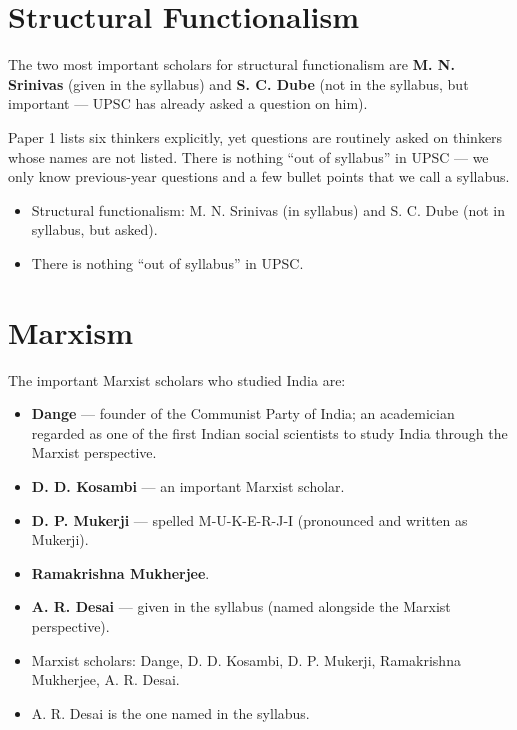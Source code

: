 \section{Structural Functionalism}

The two most important scholars for structural functionalism are \textbf{M. N. Srinivas} (given in the syllabus) and \textbf{S. C. Dube} (not in the syllabus, but important --- UPSC has already asked a question on him).

\begin{CriticalPoint}
Paper 1 lists six thinkers explicitly, yet questions are routinely asked on thinkers whose names are not listed. There is nothing ``out of syllabus'' in UPSC --- we only know previous-year questions and a few bullet points that we call a syllabus.
\end{CriticalPoint}

\begin{QuickRevision}
\begin{itemize}
\item Structural functionalism: M. N. Srinivas (in syllabus) and S. C. Dube (not in syllabus, but asked).
\item There is nothing ``out of syllabus'' in UPSC.
\end{itemize}
\end{QuickRevision}

\section{Marxism}

The important Marxist scholars who studied India are:
\begin{itemize}
\item \textbf{Dange} --- founder of the Communist Party of India; an academician regarded as one of the first Indian social scientists to study India through the Marxist perspective.
\item \textbf{D. D. Kosambi} --- an important Marxist scholar.
\item \textbf{D. P. Mukerji} --- spelled M-U-K-E-R-J-I (pronounced and written as Mukerji).
\item \textbf{Ramakrishna Mukherjee}.
\item \textbf{A. R. Desai} --- given in the syllabus (named alongside the Marxist perspective).
\end{itemize}

\begin{QuickRevision}
\begin{itemize}
\item Marxist scholars: Dange, D. D. Kosambi, D. P. Mukerji, Ramakrishna Mukherjee, A. R. Desai.
\item A. R. Desai is the one named in the syllabus.
\end{itemize}
\end{QuickRevision}

